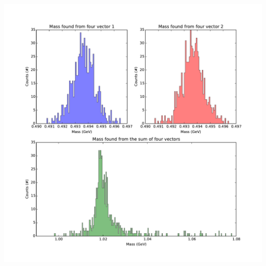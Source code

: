 \documentclass[pdftex]{article}
\begin{document}
\begin{enumerate}
{		\includegraphics[scale=0.5]{Problem_2.pdf}\\
	}

\end{enumerate}
\end{document}
